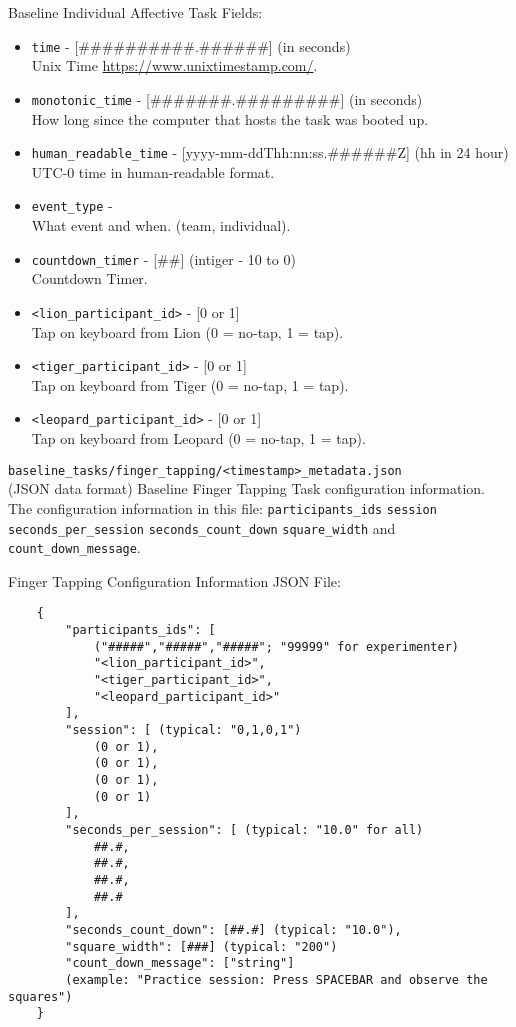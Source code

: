 \begin{description}
Baseline Individual Affective Task Fields:
\begin{itemize}
    \item \verb|time| - [\#\#\#\#\#\#\#\#\#\#.\#\#\#\#\#\#] (in seconds)\\Unix Time \href{https://www.unixtimestamp.com/}{https://www.unixtimestamp.com/}.
    \item \verb|monotonic_time| - [\#\#\#\#\#\#\#.\#\#\#\#\#\#\#\#\#] (in seconds)\\How long since the computer that hosts the task was booted up.
    \item \verb|human_readable_time| - [yyyy-mm-ddThh:nn:ss.\#\#\#\#\#\#Z] (hh in 24 hour)\\ UTC-0 time in human-readable format.
    \item \verb|event_type| -\\What event and when. (team, individual).
    \item \verb|countdown_timer| - [\#\#] (intiger - 10 to 0)\\Countdown Timer.
    \item \verb|<lion_participant_id>| - [0 or 1]\\Tap on keyboard from Lion (0 = no-tap, 1 = tap).
    \item \verb|<tiger_participant_id>| - [0 or 1]\\Tap on keyboard from Tiger (0 = no-tap, 1 = tap).
    \item \verb|<leopard_participant_id>| - [0 or 1]\\Tap on keyboard from Leopard (0 = no-tap, 1 = tap).
\end{itemize}


\medskip
\item\verb|baseline_tasks/finger_tapping/<timestamp>_metadata.json|\\(JSON data format)
Baseline Finger Tapping Task configuration information. The configuration
information in this file: \verb|participants_ids| \verb|session|
\verb|seconds_per_session| \verb|seconds_count_down| \verb|square_width| and
\verb|count_down_message|.

Finger Tapping Configuration Information JSON File:

\begin{verbatim}
    {
        "participants_ids": [
            ("#####","#####","#####"; "99999" for experimenter)
            "<lion_participant_id>",
            "<tiger_participant_id>",
            "<leopard_participant_id>"
        ],
        "session": [ (typical: "0,1,0,1")
            (0 or 1),
            (0 or 1),
            (0 or 1),
            (0 or 1)
        ],
        "seconds_per_session": [ (typical: "10.0" for all)
            ##.#,
            ##.#,
            ##.#,
            ##.#
        ],
        "seconds_count_down": [##.#] (typical: "10.0"),
        "square_width": [###] (typical: "200")
        "count_down_message": ["string"]
        (example: "Practice session: Press SPACEBAR and observe the squares")
    }
\end{verbatim}




\end{description}
